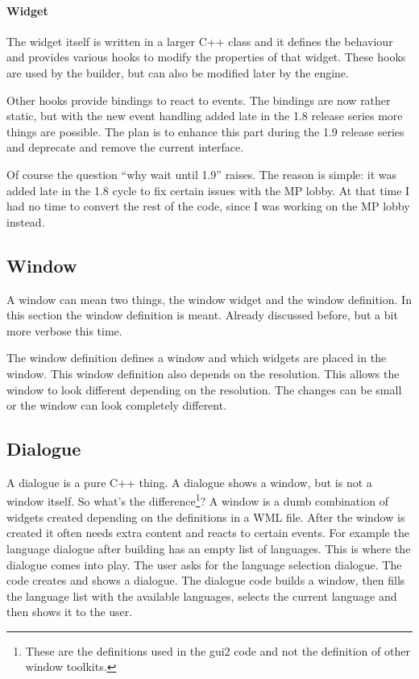 \paragraph{Widget}
The widget itself is written in a larger C++ class and it defines the behaviour
and provides various hooks to modify the properties of that widget. These hooks
are used by the builder, but can also be modified later by the engine.

Other hooks provide bindings to react to events. The bindings are now rather
static, but with the new event handling added late in the 1.8 release series
more things are possible. The plan is to enhance this part during the 1.9
release series and deprecate and remove the current interface.

Of course the question ``why wait until 1.9'' raises. The reason is simple: it
was added late in the 1.8 cycle to fix certain issues with the MP lobby. At that
time I had no time to convert the rest of the code, since I was working on the
MP lobby instead.

\subsection{Window}

A window can mean two things, the window widget and the window definition. In
this section the window definition is meant. Already discussed before, but a bit
more verbose this time.

The window definition defines a window and which widgets are placed in the
window. This window definition also depends on the resolution. This allows the
window to look different depending on the resolution. The changes can be small
or the window can look completely different.

\subsection{Dialogue}

A dialogue is a pure C++ thing. A dialogue shows a window, but is not a window itself.
So what's the difference\footnote{These are the definitions used in the gui2
code and not the definition of other window toolkits.}? A window is a dumb
combination of widgets created depending on the definitions in a WML file. After
the window is created it often needs extra content and reacts to certain events.
For example the language dialogue after building has an empty list of languages.
This is where the dialogue comes into play. The user asks for the language
selection dialogue. The code creates and shows a dialogue. The dialogue code
builds a window, then fills the language list with the available languages,
selects the current language and then shows it to the user.

